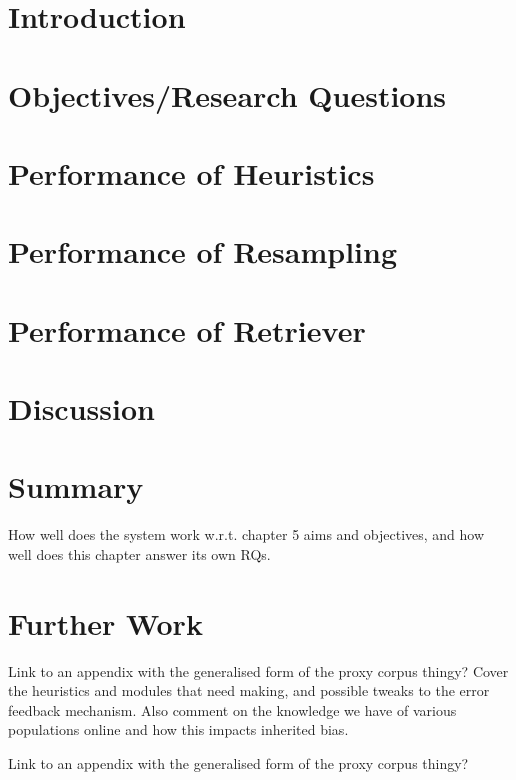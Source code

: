 \section*{Introduction}
\label{sec:evaluation:introduction}



\section{Objectives/Research Questions}
\label{sec:evaluation:rqs}



\section{Performance of Heuristics}
\label{sec:evaluation:heuristics}



\section{Performance of Resampling}
\label{sec:evaluation:resampler}



\section{Performance of Retriever}
\label{sec:evaluation:retrieval}



\section{Discussion}
\label{sec:evaluation:discussion}



\section{Summary}
How well does the system work w.r.t. chapter 5 aims and objectives, and how well does this chapter answer its own RQs.


\section{Further Work}
Link to an appendix with the generalised form of the proxy corpus thingy?
\label{sec:evaluation:furtherwork}
Cover the heuristics and modules that need making, and possible tweaks to the error feedback mechanism.  Also comment on the knowledge we have of various populations online and how this impacts inherited bias.

Link to an appendix with the generalised form of the proxy corpus thingy?
